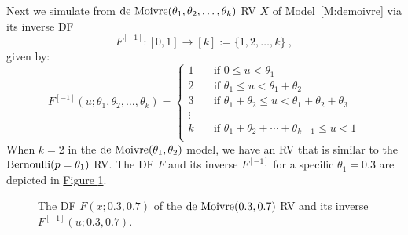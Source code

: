 Next we simulate from $\mbox{{\rm de~Moivre}}(\theta_1,\theta_2,\ldots,\theta_k)$ RV $X$ of Model~\ref{M:demoivre} via its inverse DF $$F^{[-1]}: [0,1] \rightarrow [k] := \{1,2,\ldots,k\} \ ,$$ given by:
\begin{equation}\label{E:deMoivreInverseDF}
F^{[-1]}(u;\theta_1,\theta_2,\ldots,\theta_k) =
\begin{cases}
1 & \quad \text{if $0 \leq u < \theta_1$}\\
2 & \quad \text{if $\theta_1 \leq u < \theta_1+\theta_2$} \\
3 & \quad \text{if $\theta_1+\theta_2 \leq u < \theta_1+\theta_2+\theta_3$} \\
\vdots & \\
k & \quad \text{if $\theta_1+\theta_2+\cdots+\theta_{k-1} \leq u < 1$} \\
\end{cases}
\end{equation}
When $k=2$ in the $\mbox{{\rm de~Moivre}}(\theta_1,\theta_2)$ model, we have an RV that is similar to the $\mbox{{\rm Bernoulli}}(p=\theta_1)$ RV.  The DF $F$ and its inverse $F^{[-1]}$ for a specific $\theta_1=0.3$ are depicted in \hyperref[F:InvSamk2]{Figure \ref*{F:InvSamk2}}.

\begin{figure}[htpb]
\caption{The DF $F(x;0.3,0.7)$ of the $\mbox{{\rm de~Moivre}}(0.3,0.7)$ RV and its inverse $F^{[-1]}(u;0.3,0.7)$. \label{F:InvSamk2}}
\centering   {}
\end{figure}

